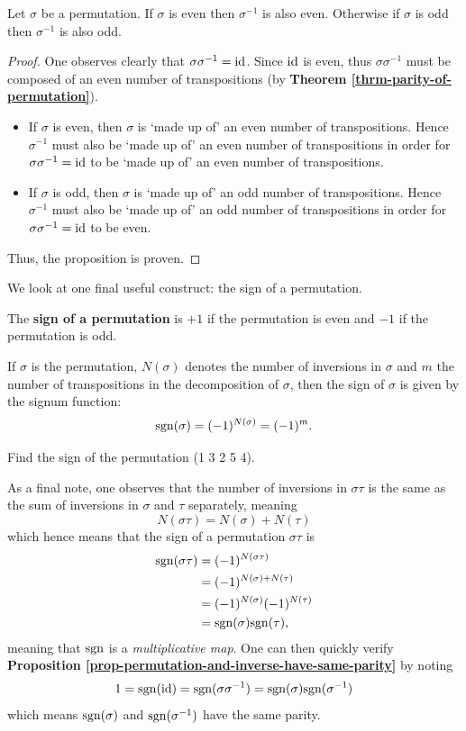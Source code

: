 \begin{proposition}\label{prop-permutation-and-inverse-have-same-parity}
    Let $\sigma$ be a permutation. If $\sigma$ is even then $\sigma^{-1}$ is also even. Otherwise if $\sigma$ is odd then $\sigma^{-1}$ is also odd.
\end{proposition}
\begin{proof}
    One observes clearly that $\sigma\sigma^{-1} = \mathrm{id}$. Since $\mathrm{id}$ is even, thus $\sigma\sigma^{-1}$ must be composed of an even number of transpositions (by \textbf{Theorem \ref{thrm-parity-of-permutation}}).
    \begin{itemize}
        \item If $\sigma$ is even, then $\sigma$ is `made up of' an even number of transpositions. Hence $\sigma^{-1}$ must also be `made up of' an even number of transpositions in order for $\sigma\sigma^{-1} = \mathrm{id}$ to be `made up of' an even number of transpositions.
        \item If $\sigma$ is odd, then $\sigma$ is `made up of' an odd number of transpositions. Hence $\sigma^{-1}$ must also be `made up of' an odd number of transpositions in order for $\sigma\sigma^{-1} = \mathrm{id}$ to be even.
    \end{itemize}
    Thus, the proposition is proven.
\end{proof}

We look at one final useful construct: the sign of a permutation.
\begin{definition}
    The \textbf{sign of a permutation} is $+1$ if the permutation is even and $-1$ if the permutation is odd.
\end{definition}
If $\sigma$ is the permutation, $N(\sigma)$ denotes the number of inversions in $\sigma$ and $m$ the number of transpositions in the decomposition of $\sigma$, then the sign of $\sigma$ is given by the signum function:
\[
    \mathrm{sgn}(\sigma) = (-1)^{N(\sigma)} = (-1)^m.
\]
\begin{exercise}
    Find the sign of the permutation (1 3 2 5 4).
\end{exercise}

As a final note, one observes that the number of inversions in $\sigma\tau$ is the same as the sum of inversions in $\sigma$ and $\tau$ separately, meaning
\[
    N(\sigma\tau) = N(\sigma) + N(\tau)
\]
which hence means that the sign of a permutation $\sigma\tau$ is
\begin{align*}
    \mathrm{sgn}(\sigma\tau) &= (-1)^{N(\sigma\tau)}\\
    &= (-1)^{N(\sigma) + N(\tau)}\\
    &= (-1)^{N(\sigma)}(-1)^{N(\tau)}\\
    &= \mathrm{sgn}(\sigma)\mathrm{sgn}(\tau),
\end{align*}
meaning that $\mathrm{sgn}$ is a \textit{multiplicative map}. One can then quickly verify \textbf{Proposition \ref{prop-permutation-and-inverse-have-same-parity}} by noting
\[
    1 = \mathrm{sgn}(\mathrm{id}) = \mathrm{sgn}(\sigma\sigma^{-1}) = \mathrm{sgn}(\sigma)\mathrm{sgn}(\sigma^{-1})
\]
which means $\mathrm{sgn}(\sigma)$ and $\mathrm{sgn}(\sigma^{-1})$ have the same parity.

